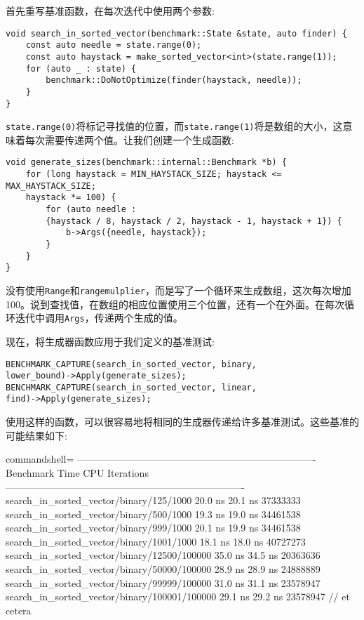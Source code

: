 首先重写基准函数，在每次迭代中使用两个参数:

\begin{lstlisting}[style=styleCXX]
void search_in_sorted_vector(benchmark::State &state, auto finder) {
	const auto needle = state.range(0);
	const auto haystack = make_sorted_vector<int>(state.range(1));
	for (auto _ : state) {
		benchmark::DoNotOptimize(finder(haystack, needle));
	}
}
\end{lstlisting}

\texttt{state.range(0)}将标记寻找值的位置，而\texttt{state.range(1)}将是数组的大小，这意味着每次需要传递两个值。让我们创建一个生成函数:

\begin{lstlisting}[style=styleCXX]
void generate_sizes(benchmark::internal::Benchmark *b) {
	for (long haystack = MIN_HAYSTACK_SIZE; haystack <= MAX_HAYSTACK_SIZE;
	haystack *= 100) {
		for (auto needle :
		{haystack / 8, haystack / 2, haystack - 1, haystack + 1}) {
			b->Args({needle, haystack});
		}
	}
}
\end{lstlisting}

没有使用\texttt{Range}和\texttt{rangemulplier}，而是写了一个循环来生成数组，这次每次增加100。说到查找值，在数组的相应位置使用三个位置，还有一个在外面。在每次循环迭代中调用\texttt{Args}，传递两个生成的值。

现在，将生成器函数应用于我们定义的基准测试:

\begin{lstlisting}[style=styleCXX]
BENCHMARK_CAPTURE(search_in_sorted_vector, binary,
lower_bound)->Apply(generate_sizes);
BENCHMARK_CAPTURE(search_in_sorted_vector, linear,
find)->Apply(generate_sizes);
\end{lstlisting}

使用这样的函数，可以很容易地将相同的生成器传递给许多基准测试。这些基准的可能结果如下:

\begin{tcblisting}{commandshell={}}
-------------------------------------------------------------------------
Benchmark Time CPU Iterations
-------------------------------------------------------------------------
search_in_sorted_vector/binary/125/1000 20.0 ns 20.1 ns 37333333
search_in_sorted_vector/binary/500/1000 19.3 ns 19.0 ns 34461538
search_in_sorted_vector/binary/999/1000 20.1 ns 19.9 ns 34461538
search_in_sorted_vector/binary/1001/1000 18.1 ns 18.0 ns 40727273
search_in_sorted_vector/binary/12500/100000 35.0 ns 34.5 ns 20363636
search_in_sorted_vector/binary/50000/100000 28.9 ns 28.9 ns 24888889
search_in_sorted_vector/binary/99999/100000 31.0 ns 31.1 ns 23578947
search_in_sorted_vector/binary/100001/100000 29.1 ns 29.2 ns 23578947
// et cetera
\end{tcblisting}

